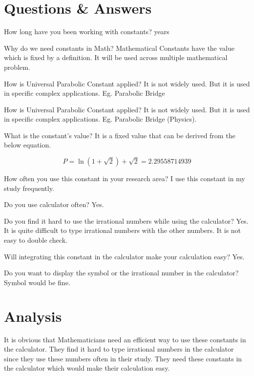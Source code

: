 \documentclass{report}
\begin{document}
\section{Questions \& Answers}
\begin{qanda}
 
\Q How long have you been working with constants?
 years

\Q Why do we need constants in Math?
\A Mathematical Constants have the value which is fixed by a definition. It will be used across multiple mathematical problem.

\Q How is Universal Parabolic Constant applied?
\A It is not widely used. But it is used in specific complex applications. Eg. Parabolic Bridge


\Q How is Universal Parabolic Constant applied?
\A It is not widely used. But it is used in specific complex applications. Eg. Parabolic Bridge (Physics).

\Q What is the constant's value?
\A It is a fixed value that can be derived from the below equation.

\begin{equation}
P = \ln(1+\sqrt{2})+\sqrt{2} = 2.29558714939
\end{equation}

\Q How often you use this constant in your research area?
\A I use this constant in my study frequently.

\Q Do you use calculator often?
\A Yes.

\Q Do you find it hard to use the irrational numbers while using the calculator? 
\A Yes. It is quite difficult to type irrational numbers with the other numbers. It is not easy to double check.

\Q  Will integrating this constant in the calculator make your calculation easy? 
\A Yes. 

\Q  Do you want to display the symbol or the irrational number in the calculator?
\A  Symbol would be fine.






\section{Analysis}

It is obvious that Mathematicians need an efficient way to use these constants in the calculator. They find it hard to type irrational numbers in the calculator since they use these numbers often in their study. They need these constants in the calculator which would make their calculation easy. 



\end{qanda}
\newpage
\end{document}
